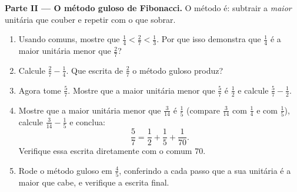 \begin{problem}
\medskip
\noindent\textbf{Parte II --- O método guloso de Fibonacci.}
O método é: subtrair a \emph{maior}  unitária que couber e
repetir com o que sobrar.
\begin{enumerate}[resume]
  \item Usando  comuns, mostre que
        $\frac14 < \frac27 < \frac13$. Por que isso demonstra que
        $\frac14$ é a maior  unitária menor que $\frac27$?
  \item Calcule $\frac27 - \frac14$. Que escrita de $\frac27$ o método
        guloso produz?
  \item Agora tome $\frac57$. Mostre que a maior  unitária menor
        que $\frac57$ é $\frac12$ e calcule $\frac57 - \frac12$.
  \item Mostre que a maior  unitária menor que $\frac{3}{14}$ é
        $\frac15$ (compare $\frac{3}{14}$ com $\frac14$ e com
        $\frac15$), calcule $\frac{3}{14} - \frac15$ e conclua:
        \[
        \frac57 = \frac12 + \frac15 + \frac{1}{70} .
        \]
        Verifique essa escrita diretamente com o  comum
        $70$.
  \item Rode o método guloso em $\frac45$, conferindo a cada passo que
        a sua  unitária é a maior que cabe, e verifique a escrita
        final.
\end{enumerate}


\end{problem}
